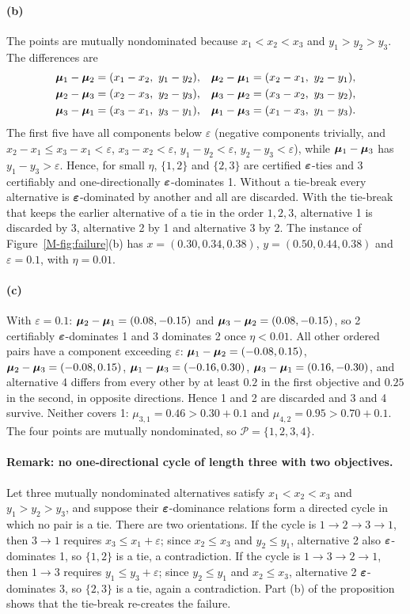 \paragraph{(b)} The points are mutually nondominated because $x_1<x_2<x_3$ and $y_1>y_2>y_3$. The differences are
\begin{align*}
\bm{\mu}_1-\bm{\mu}_2&=(x_1-x_2,\ y_1-y_2), & \bm{\mu}_2-\bm{\mu}_1&=(x_2-x_1,\ y_2-y_1),\\
\bm{\mu}_2-\bm{\mu}_3&=(x_2-x_3,\ y_2-y_3), & \bm{\mu}_3-\bm{\mu}_2&=(x_3-x_2,\ y_3-y_2),\\
\bm{\mu}_3-\bm{\mu}_1&=(x_3-x_1,\ y_3-y_1), & \bm{\mu}_1-\bm{\mu}_3&=(x_1-x_3,\ y_1-y_3).
\end{align*}
The first five have all components below $\varepsilon$ (negative components trivially, and $x_2-x_1\le x_3-x_1<\varepsilon$, $x_3-x_2<\varepsilon$, $y_1-y_2<\varepsilon$, $y_2-y_3<\varepsilon$), while $\bm{\mu}_1-\bm{\mu}_3$ has $y_1-y_3>\varepsilon$. Hence, for small $\eta$, $\{1,2\}$ and $\{2,3\}$ are certified $\bm{\varepsilon}$-ties and 3 certifiably and one-directionally $\bm{\varepsilon}$-dominates 1. Without a tie-break every alternative is $\bm{\varepsilon}$-dominated by another and all are discarded. With the tie-break that keeps the earlier alternative of a tie in the order $1,2,3$, alternative 1 is discarded by 3, alternative 2 by 1 and alternative 3 by 2. The instance of Figure~\ref{M-fig:failure}(b) has $x=(0.30,0.34,0.38)$, $y=(0.50,0.44,0.38)$ and $\varepsilon=0.1$, with $\eta=0.01$.

\paragraph{(c)} With $\varepsilon=0.1$: $\bm{\mu}_2-\bm{\mu}_1=(0.08,-0.15)$ and $\bm{\mu}_3-\bm{\mu}_2=(0.08,-0.15)$, so 2 certifiably $\bm{\varepsilon}$-dominates 1 and 3 dominates 2 once $\eta<0.01$. All other ordered pairs have a component exceeding $\varepsilon$: $\bm{\mu}_1-\bm{\mu}_2=(-0.08,0.15)$, $\bm{\mu}_2-\bm{\mu}_3=(-0.08,0.15)$, $\bm{\mu}_1-\bm{\mu}_3=(-0.16,0.30)$, $\bm{\mu}_3-\bm{\mu}_1=(0.16,-0.30)$, and alternative 4 differs from every other by at least $0.2$ in the first objective and $0.25$ in the second, in opposite directions. Hence 1 and 2 are discarded and 3 and 4 survive. Neither covers 1: $\mu_{3,1}=0.46>0.30+0.1$ and $\mu_{4,2}=0.95>0.70+0.1$. The four points are mutually nondominated, so $\mathcal P=\{1,2,3,4\}$.

\paragraph{Remark: no one-directional cycle of length three with two objectives.} Let three mutually nondominated alternatives satisfy $x_1<x_2<x_3$ and $y_1>y_2>y_3$, and suppose their $\bm{\varepsilon}$-dominance relations form a directed cycle in which no pair is a tie. There are two orientations. If the cycle is $1\to2\to3\to1$, then $3\to1$ requires $x_3\le x_1+\varepsilon$; since $x_2\le x_3$ and $y_2\le y_1$, alternative 2 also $\bm{\varepsilon}$-dominates 1, so $\{1,2\}$ is a tie, a contradiction. If the cycle is $1\to3\to2\to1$, then $1\to3$ requires $y_1\le y_3+\varepsilon$; since $y_2\le y_1$ and $x_2\le x_3$, alternative 2 $\bm{\varepsilon}$-dominates 3, so $\{2,3\}$ is a tie, again a contradiction. Part (b) of the proposition shows that the tie-break re-creates the failure.

